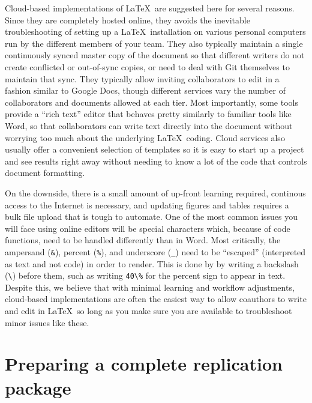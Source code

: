 Cloud-based implementations of \LaTeX\ are suggested here for several reasons.
Since they are completely hosted online,
they avoids the inevitable troubleshooting of setting up a \LaTeX\ installation
on various personal computers run by the different members of your team.
They also typically maintain a single continuously synced master copy of the document
so that different writers do not create conflicted or out-of-sync copies,
or need to deal with Git themselves to maintain that sync.
They typically allow inviting collaborators to edit in a fashion similar to Google Docs,
though different services vary the number of collaborators and documents allowed at each tier.
Most importantly, some tools provide a ``rich text'' editor
that behaves pretty similarly to familiar tools like Word,
so that collaborators can write text directly into the document without worrying too much
about the underlying \LaTeX\ coding.
Cloud services also usually offer a convenient selection of templates
so it is easy to start up a project and see results right away
without needing to know a lot of the code that controls document formatting.

On the downside, there is a small amount of up-front learning required,
continous access to the Internet is necessary,
and updating figures and tables requires a bulk file upload that is tough to automate.
One of the most common issues you will face using online editors will be special characters
which, because of code functions, need to be handled differently than in Word.
Most critically, the ampersand (\texttt{\&}), percent (\texttt{\%}), and underscore (\texttt{\_})
need to be ``escaped'' (interpreted as text and not code) in order to render.
This is done by by writing a backslash (\texttt{\textbackslash}) before them,
such as writing \texttt{40\textbackslash\%} for the percent sign to appear in text.
Despite this, we believe that with minimal learning and workflow adjustments,
cloud-based implementations are often the easiest way to allow coauthors to write and edit in \LaTeX\,
so long as you make sure you are available to troubleshoot minor issues like these.


\section{Preparing a complete replication package}

